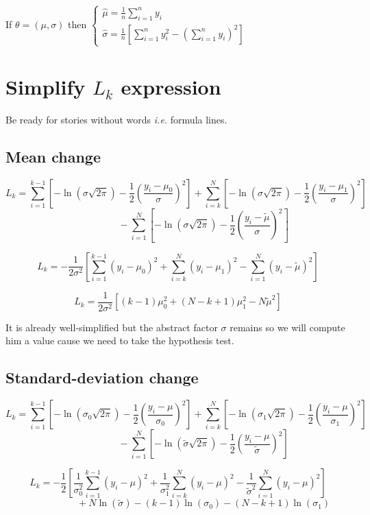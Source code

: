 \documentclass[11pt]{article}
\begin{document}
If $\theta=(\mu,\sigma)$ then $\begin{cases}\hat\mu=\frac 1n\sum_{i=1}^ny_i\\
\hat\sigma=\frac 1n\left[\sum_{i=1}^ny_i^2-(\sum_{i=1}^ny_i)^2\right]\end{cases}$

\section{Simplify $L_k$ expression}

Be ready for stories without words \emph{i.e.} formula lines.

\subsection{Mean change}

\[L_k=
\sum_{i=1}^{k-1}\left[-\ln(\sigma\sqrt{2\pi})-\frac 12\left(\frac{y_i-\mu_0}{\sigma}\right)^2\right]
+\sum_{i=k}^N\left[-\ln(\sigma\sqrt{2\pi})-\frac 12\left(\frac{y_i-\mu_1}{\sigma}\right)^2\right]\]
\[~~~~~~~~~~~~~~~~~~~~~~~~-\sum_{i=1}^N\left[-\ln(\sigma\sqrt{2\pi})-\frac 12\left(\frac{y_i-\tilde\mu}{\sigma}\right)^2\right]\]

\[L_k=
-\frac 1{2\sigma^2}\left[\sum_{i=1}^{k-1}(y_i-\mu_0)^2
+\sum_{i=k}^N(y_i-\mu_1)^2
-\sum_{i=1}^N(y_i-\tilde\mu)^2\right]\]

\[L_k=\frac 1{2\sigma^2}\left[(k-1)\mu_0^2+(N-k+1)\mu_1^2-N\tilde\mu^2\right]\]

It is already well-simplified but the abstract factor $\sigma$ remains so we will compute him a value cause we need to take the hypothesis test.

\subsection{Standard-deviation change}

\[L_k=
\sum_{i=1}^{k-1}\left[-\ln(\sigma_0\sqrt{2\pi})-\frac 12\left(\frac{y_i-\mu}{\sigma_0}\right)^2\right]
+\sum_{i=k}^N\left[-\ln(\sigma_1\sqrt{2\pi})-\frac 12\left(\frac{y_i-\mu}{\sigma_1}\right)^2\right]\]
\[~~~~~~~~~~~~~~~~~~~~~~~~-\sum_{i=1}^N\left[-\ln(\tilde\sigma\sqrt{2\pi})-\frac 12\left(\frac{y_i-\mu}{\tilde\sigma}\right)^2\right]\]

\[L_k=
-\frac 12\left[\frac 1{\sigma_0^2}\sum_{i=1}^{k-1}(y_i-\mu)^2
+\frac 1{\sigma_1^2}\sum_{i=k}^N(y_i-\mu)^2
-\frac 1{\tilde\sigma^2}\sum_{i=1}^N(y_i-\mu)^2\right]\]
\[~~~~~~~~~~~~~~~~~~~~~~~~+N\ln(\tilde\sigma)-(k-1)\ln(\sigma_0)-(N-k+1)\ln(\sigma_1)\]
\end{document}
